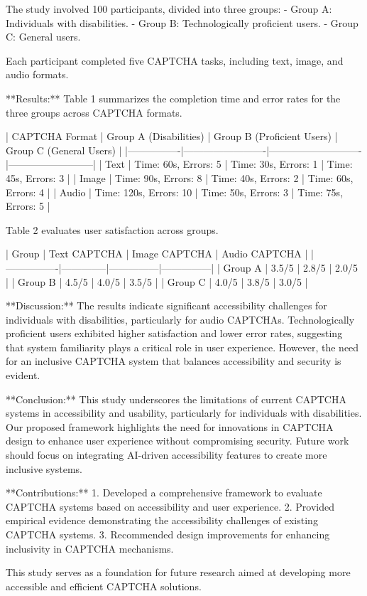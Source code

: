 The study involved 100 participants, divided into three groups:  
- Group A: Individuals with disabilities.  
- Group B: Technologically proficient users.  
- Group C: General users.  

Each participant completed five CAPTCHA tasks, including text, image, and audio formats.  

**Results:**  
Table 1 summarizes the completion time and error rates for the three groups across CAPTCHA formats.  

| CAPTCHA Format | Group A (Disabilities) | Group B (Proficient Users) | Group C (General Users) |  
|----------------|-------------------------|----------------------------|--------------------------|  
| Text           | Time: 60s, Errors: 5   | Time: 30s, Errors: 1       | Time: 45s, Errors: 3    |  
| Image          | Time: 90s, Errors: 8   | Time: 40s, Errors: 2       | Time: 60s, Errors: 4    |  
| Audio          | Time: 120s, Errors: 10 | Time: 50s, Errors: 3       | Time: 75s, Errors: 5    |  

Table 2 evaluates user satisfaction across groups.  

| Group          | Text CAPTCHA | Image CAPTCHA | Audio CAPTCHA |  
|----------------|--------------|---------------|---------------|  
| Group A        | 3.5/5        | 2.8/5         | 2.0/5         |  
| Group B        | 4.5/5        | 4.0/5         | 3.5/5         |  
| Group C        | 4.0/5        | 3.8/5         | 3.0/5         |  

**Discussion:**  
The results indicate significant accessibility challenges for individuals with disabilities, particularly for audio CAPTCHAs. Technologically proficient users exhibited higher satisfaction and lower error rates, suggesting that system familiarity plays a critical role in user experience. However, the need for an inclusive CAPTCHA system that balances accessibility and security is evident.  

**Conclusion:**  
This study underscores the limitations of current CAPTCHA systems in accessibility and usability, particularly for individuals with disabilities. Our proposed framework highlights the need for innovations in CAPTCHA design to enhance user experience without compromising security. Future work should focus on integrating AI-driven accessibility features to create more inclusive systems.  

**Contributions:**  
1. Developed a comprehensive framework to evaluate CAPTCHA systems based on accessibility and user experience.  
2. Provided empirical evidence demonstrating the accessibility challenges of existing CAPTCHA systems.  
3. Recommended design improvements for enhancing inclusivity in CAPTCHA mechanisms.  

This study serves as a foundation for future research aimed at developing more accessible and efficient CAPTCHA solutions.